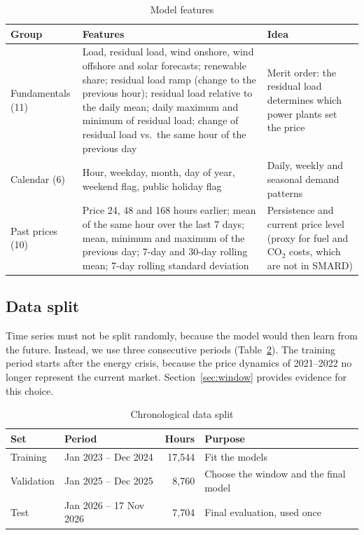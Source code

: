 \documentclass[12pt,oneside]{article}
\begin{document}
\begin{table}[!htbp]
    \centering
    \caption{Model features}
    \begin{tabularx}{\textwidth}{lXX}
        \toprule
        Group & Features & Idea \\
        \midrule
        Fundamentals (11) & Load, residual load, wind onshore, wind offshore and solar forecasts; renewable share; residual load ramp (change to the previous hour); residual load relative to the daily mean; daily maximum and minimum of residual load; change of residual load vs.\ the same hour of the previous day & Merit order: the residual load determines which power plants set the price \\
        \midrule
        Calendar (6) & Hour, weekday, month, day of year, weekend flag, public holiday flag & Daily, weekly and seasonal demand patterns \\
        \midrule
        Past prices (10) & Price 24, 48 and 168 hours earlier; mean of the same hour over the last 7 days; mean, minimum and maximum of the previous day; 7-day and 30-day rolling mean; 7-day rolling standard deviation & Persistence and current price level (proxy for fuel and CO$_2$ costs, which are not in SMARD) \\
        \bottomrule
    \end{tabularx}
    \label{tab:features}
\end{table}

\subsection{Data split}

Time series must not be split randomly, because the model would then learn from the future. Instead, we use three consecutive periods (Table~\ref{tab:split}). The training period starts after the energy crisis, because the price dynamics of 2021--2022 no longer represent the current market. Section~\ref{sec:window} provides evidence for this choice.

\begin{table}[h!]
    \centering
    \caption{Chronological data split}
    \begin{tabular}{llrl}
        \toprule
        Set & Period & Hours & Purpose \\
        \midrule
        Training & Jan 2023 -- Dec 2024 & 17,544 & Fit the models \\
        Validation & Jan 2025 -- Dec 2025 & 8,760 & Choose the window and the final model \\
        Test & Jan 2026 -- 17 Nov 2026 & 7,704 & Final evaluation, used once \\
        \bottomrule
    \end{tabular}
    \label{tab:split}
\end{table}
\end{document}

